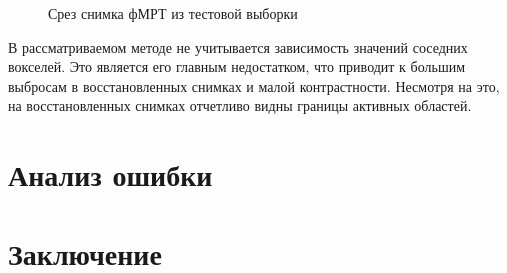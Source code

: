 \documentclass[a4paper, 12pt]{article}
\begin{document}
	\begin{figure}[h!]
		\centering
		\hfill
		\hfill
		\caption{Срез снимка фМРТ из тестовой выборки}
		\label{fig:3}
	\end{figure}

	В рассматриваемом методе не учитывается зависимость значений соседних вокселей.
	Это является его главным недостатком, что приводит к большим выбросам в восстановленных снимках
	и малой контрастности. Несмотря на это, на восстановленных снимках отчетливо видны границы
	активных областей.

\section{Анализ ошибки}

\section{Заключение}



\end{document}
